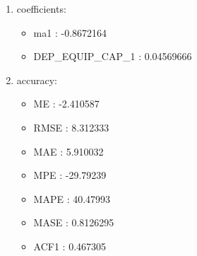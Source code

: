\documentclass[10pt,a4paper]{article}\usepackage[]{graphicx}\usepackage[]{color}
\newcommand{\AaA}{\_}
\begin{document}
\begin{multicols}{2}
\begin{enumerate}
\item coefficients:
\begin{itemize}
\item  ma1 :  -0.8672164 
\item  DEP\AaA EQUIP\AaA CAP\AaA 1 :  0.04569666 
\end{itemize}
\item accuracy:
\begin{itemize}
\item  ME :  -2.410587 
\item  RMSE :  8.312333 
\item  MAE :  5.910032 
\item  MPE :  -29.79239 
\item  MAPE :  40.47993 
\item  MASE :  0.8126295 
\item  ACF1 :  0.467305 
\end{itemize}
\end{enumerate}
\end{multicols}
\end{document}
